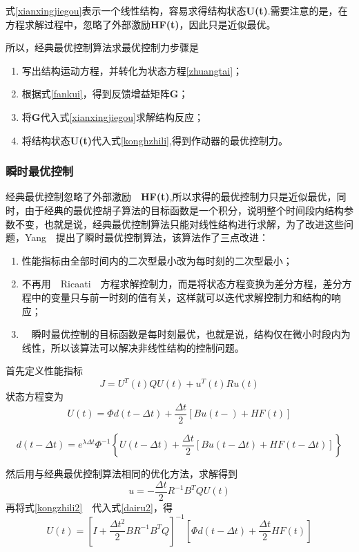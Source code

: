 式\eqref{xianxingjiegou}表示一个线性结构，容易求得结构状态\textbf{U(t)}.需要注意的是，在方程求解过程中，忽略了外部激励\textbf{HF(t)}，因此只是近似最优。

所以，经典最优控制算法求最优控制力步骤是
\begin{enumerate}
\item 写出结构运动方程，并转化为状态方程\eqref{zhuangtai}；
\item 根据式\eqref{fankui}，得到反馈增益矩阵\textbf{G}；
\item 将\textbf{G}代入式\eqref{xianxingjiegou}求解结构反应；
\item 将结构状态\textbf{U(t)}代入式\eqref{konghzhili},得到作动器的最优控制力。
\end{enumerate}
\subsubsection{瞬时最优控制}
经典最优控制忽略了外部激励　\textbf{HF(t)},所以求得的最优控制力只是近似最优，同时，由于经典的最优控胡子算法的目标函数是一个积分，说明整个时间段内结构参数不变，也就是说，经典最优控制算法只能对线性结构进行求解，为了改进这些问题，Yang　提出了瞬时最优控制算法，该算法作了三点改进：
\begin{enumerate}
\item 性能指标由全部时间内的二次型最小改为每时刻的二次型最小；
\item 不再用　Ricaati　方程求解控制力，而是将状态方程变换为差分方程，差分方程中的变量只与前一时刻的值有关，这样就可以迭代求解控制力和结构的响应；
\item　瞬时最优控制的目标函数是每时刻最优，也就是说，结构仅在微小时段内为线性，所以该算法可以解决非线性结构的控制问题。
\end{enumerate}

首先定义性能指标
\begin{equation}
J=U^T(t)QU(t)+u^T(t)Ru(t)
\end{equation}
状态方程变为
\begin{equation}
U(t)=\Phi d(t-\Delta t)+\frac{\Delta t}{2}\left[Bu(t-)+HF(t)\right]\label{dairu2}
\end{equation}


\begin{equation}
d(t-\Delta t)=e^{\lambda \Delta t}\Phi^{-1}\left\lbrace U(t-\Delta t)+ \frac{\Delta t}{2}\left[Bu(t-\Delta t)+HF(t-\Delta t)\right]\right\rbrace\label{dairu3}
\end{equation}

然后用与经典最优控制算法相同的优化方法，求解得到
\begin{equation}
u=-\frac{\Delta t}{2}R^{-1}B^TQU(t)    \label{kongzhili2}
\end{equation}
再将式\eqref{kongzhili2}　代入式\eqref{dairu2}，得
\begin{equation}
U(t)=\left[I+\frac{\Delta t^2}{2}BR^{-1}B^TQ\right]^{-1}\left[\Phi d(t-\Delta t) +\frac{\Delta t}{2}HF(t)\right]  \label{diedai}
\end{equation}

